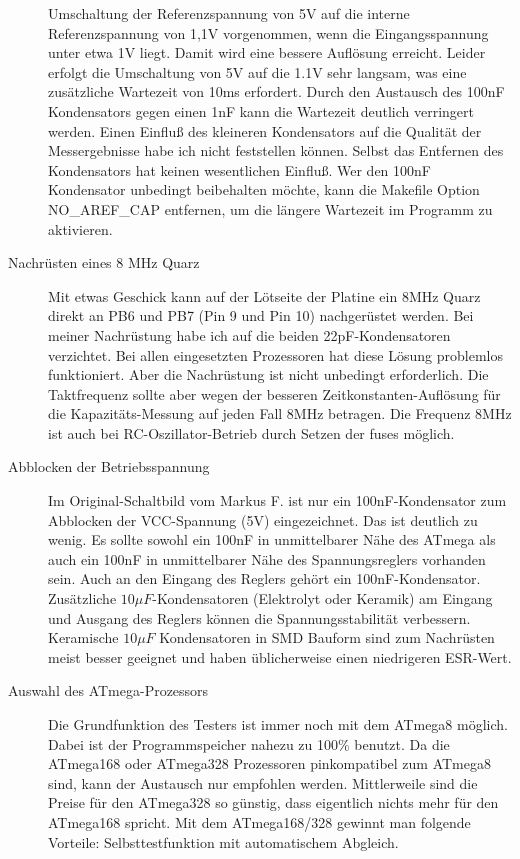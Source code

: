 \begin{description}
Umschaltung der Referenzspannung von 5V auf die interne Referenzspannung von 1,1V vorgenommen,
wenn die Eingangsspannung unter etwa 1V liegt. Damit wird eine bessere Auflösung erreicht.
Leider erfolgt die Umschaltung von 5V auf die 1.1V sehr langsam, was eine zusätzliche
Wartezeit von 10ms erfordert. Durch den Austausch des 100nF Kondensators gegen einen 1nF
kann die Wartezeit deutlich verringert werden. Einen Einfluß des kleineren Kondensators
auf die Qualität der Messergebnisse habe ich nicht feststellen können. Selbst das Entfernen
des Kondensators hat keinen wesentlichen Einfluß. Wer den 100nF Kondensator unbedingt
beibehalten möchte, kann die Makefile Option NO\_AREF\_CAP entfernen, um die längere
Wartezeit im Programm zu aktivieren.
\item[Nachrüsten eines 8 MHz Quarz]
Mit etwas Geschick kann auf der Lötseite der Platine ein 8MHz Quarz direkt an PB6 und PB7
(Pin 9 und Pin 10) nachgerüstet werden.
Bei meiner Nachrüstung habe ich auf die beiden 22pF-Kondensatoren verzichtet.
Bei allen eingesetzten Prozessoren hat diese Lösung problemlos funktioniert.
Aber die Nachrüstung ist nicht unbedingt erforderlich. Die Taktfrequenz sollte aber
wegen der besseren Zeitkonstanten-Auflösung  für die Kapazitäts-Messung auf jeden Fall 8MHz betragen.
Die Frequenz 8MHz ist auch bei RC-Oszillator-Betrieb durch Setzen der fuses möglich.
\item[Abblocken der Betriebsspannung]
Im Original-Schaltbild vom Markus F. ist nur ein 100nF-Kondensator zum Abblocken der
VCC-Spannung (5V) eingezeichnet. Das ist deutlich zu wenig. Es sollte sowohl ein
100nF in unmittelbarer Nähe des ATmega als auch ein 100nF in unmittelbarer Nähe
des Spannungsreglers vorhanden sein. Auch an den Eingang des Reglers gehört ein
100nF-Kondensator. Zusätzliche \(10\mu F\)-Kondensatoren (Elektrolyt oder Keramik) am Eingang und
Ausgang des Reglers können die Spannungsstabilität verbessern. Keramische \(10\mu F\)
Kondensatoren in SMD Bauform sind zum Nachrüsten meist besser geeignet und
haben üblicherweise einen niedrigeren ESR-Wert.
\item[Auswahl des ATmega-Prozessors]
Die Grundfunktion des Testers ist immer noch mit dem ATmega8 möglich.
Dabei ist der Programmspeicher nahezu zu 100\% benutzt.
Da die ATmega168 oder ATmega328 Prozessoren pinkompatibel zum ATmega8 sind,
kann der Austausch nur empfohlen werden. Mittlerweile sind die Preise für
den ATmega328 so günstig, dass eigentlich nichts mehr für den ATmega168 spricht.
Mit dem ATmega168/328 gewinnt man folgende Vorteile:
Selbsttestfunktion mit automatischem Abgleich.\\

\end{description}

